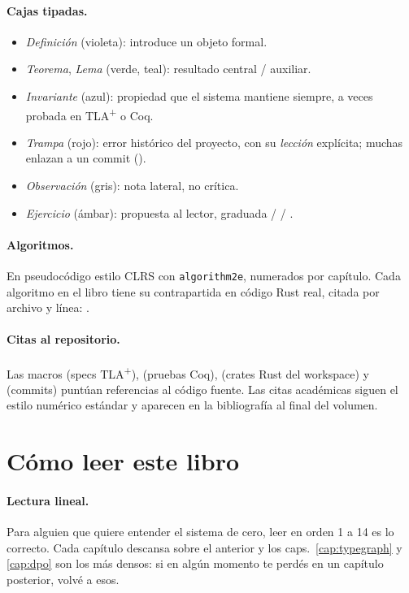 \paragraph{Cajas tipadas.}
\begin{itemize}
  \item \emph{Definición} (violeta): introduce un objeto formal.
  \item \emph{Teorema}, \emph{Lema} (verde, teal): resultado central /
    auxiliar.
  \item \emph{Invariante} (azul): propiedad que el sistema mantiene
    siempre, a veces probada en TLA\textsuperscript{+} o Coq.
  \item \emph{Trampa} (rojo): error histórico del proyecto, con su
    \emph{lección} explícita; muchas enlazan a un commit ().
  \item \emph{Observación} (gris): nota lateral, no crítica.
  \item \emph{Ejercicio} (ámbar): propuesta al lector, graduada
    \dificultad{$\star$} / \dificultad{$\star\star$} / \dificultad{$\star\star\star$}.
\end{itemize}

\paragraph{Algoritmos.} En pseudocódigo estilo CLRS con
\texttt{algorithm2e}, numerados por capítulo. Cada algoritmo en el
libro tiene su contrapartida en código Rust real, citada por archivo y
línea: .

\paragraph{Citas al repositorio.} Las macros  (specs
TLA\textsuperscript{+}),  (pruebas Coq),
 (crates Rust del workspace) y 
(commits) puntúan referencias al código fuente. Las citas académicas
siguen el estilo numérico estándar y aparecen en la bibliografía al
final del volumen.

\section{Cómo leer este libro}

\paragraph{Lectura lineal.} Para alguien que quiere entender el sistema
de cero, leer en orden 1 a 14 es lo correcto. Cada capítulo descansa
sobre el anterior y los caps.~\ref{cap:typegraph} y \ref{cap:dpo} son
los más densos: si en algún momento te perdés en un capítulo posterior,
volvé a esos.

